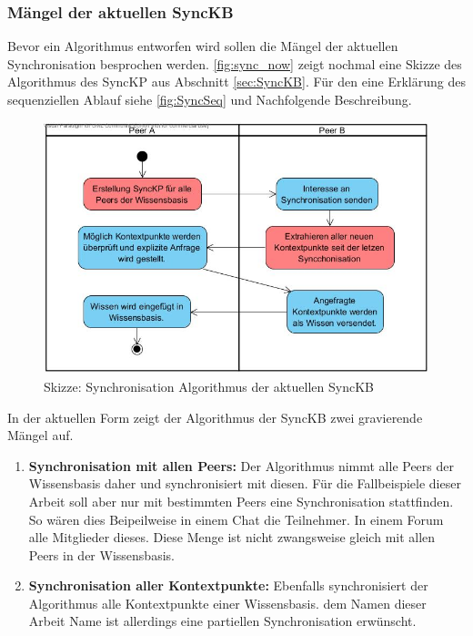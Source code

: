 \documentclass[a4paper]{article}
\begin{document}
	\subsubsection{Mängel der aktuellen SyncKB}
	
	Bevor ein Algorithmus entworfen wird sollen die Mängel der aktuellen 
	Synchronisation besprochen werden. \autoref{fig:sync_now} zeigt nochmal eine
	Skizze des Algorithmus des SyncKP aus Abschnitt \ref{sec:SyncKB}. Für den
	eine Erklärung des sequenziellen Ablauf siehe \autoref{fig:SyncSeq} und
	Nachfolgende Beschreibung.
	
	\begin{figure}[H]
		\centerline{
			\includegraphics[scale=0.495]{../Bilder/sync_flaws.jpg}
		}
		\caption{Skizze: Synchronisation Algorithmus der aktuellen SyncKB}
		\label{fig:sync_now}
	\end{figure}
	
	In der aktuellen Form zeigt der Algorithmus der SyncKB zwei gravierende Mängel
	auf.
	
	\begin{enumerate}
		\item \textbf{Synchronisation mit allen Peers:} Der Algorithmus nimmt alle
		Peers der Wissensbasis daher und synchronisiert mit diesen. Für die
		Fallbeispiele dieser Arbeit soll aber nur mit bestimmten Peers eine
		Synchronisation stattfinden. So wären dies Beipeilweise in einem Chat die
		Teilnehmer. In einem Forum alle Mitglieder dieses. Diese Menge ist
		nicht zwangsweise gleich mit allen Peers in der Wissensbasis.
		\item \textbf{Synchronisation aller Kontextpunkte:} Ebenfalls
		synchronisiert der Algorithmus alle Kontextpunkte einer Wissensbasis. 
		dem Namen dieser Arbeit Name ist allerdings eine partiellen Synchronisation
		erwünscht.		
	\end{enumerate}
	
\end{document}
